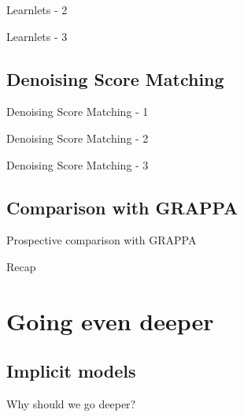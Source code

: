 \documentclass[aspectratio=169,xcolor=dvipsnames]{beamer}
\begin{document}
\begin{frame}{Learnlets - 2}
\end{frame}

\begin{frame}{Learnlets - 3}
\end{frame}

\subsection{Denoising Score Matching}
\begin{frame}{Denoising Score Matching - 1}
\end{frame}

\begin{frame}{Denoising Score Matching - 2}
\end{frame}

\begin{frame}{Denoising Score Matching - 3}
\end{frame}

\subsection{Comparison with GRAPPA}
\begin{frame}{Prospective comparison with GRAPPA}
\end{frame}

\begin{frame}{Recap}
\end{frame}

\section{Going even deeper}
\subsection{Implicit models}

\begin{frame}{Why should we go deeper?}
\end{frame}
\end{document}
